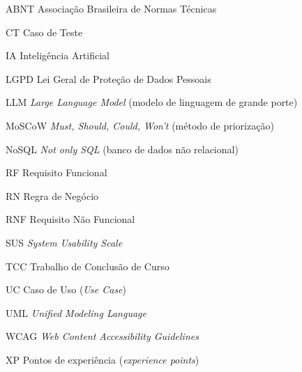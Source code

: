 %

\listoffigures*
\cleardoublepage

\listofquadros*
\cleardoublepage

\listoftables*
\cleardoublepage

\ifrelatorio
  \listofcodigos*
  \cleardoublepage
\fi

\begin{siglas}
  \item[ABNT] Associação Brasileira de Normas Técnicas
  \item[CT] Caso de Teste
  \item[IA] Inteligência Artificial
  \item[LGPD] Lei Geral de Proteção de Dados Pessoais
  \item[LLM] \textit{Large Language Model} (modelo de linguagem de grande porte)
  \item[MoSCoW] \textit{Must, Should, Could, Won't} (método de priorização)
  \item[NoSQL] \textit{Not only SQL} (banco de dados não relacional)
  \item[RF] Requisito Funcional
  \item[RN] Regra de Negócio
  \item[RNF] Requisito Não Funcional
  \item[SUS] \textit{System Usability Scale}
  \item[TCC] Trabalho de Conclusão de Curso
  \item[UC] Caso de Uso (\textit{Use Case})
  \item[UML] \textit{Unified Modeling Language}
  \item[WCAG] \textit{Web Content Accessibility Guidelines}
  \item[XP] Pontos de experiência (\textit{experience points})
\end{siglas}


